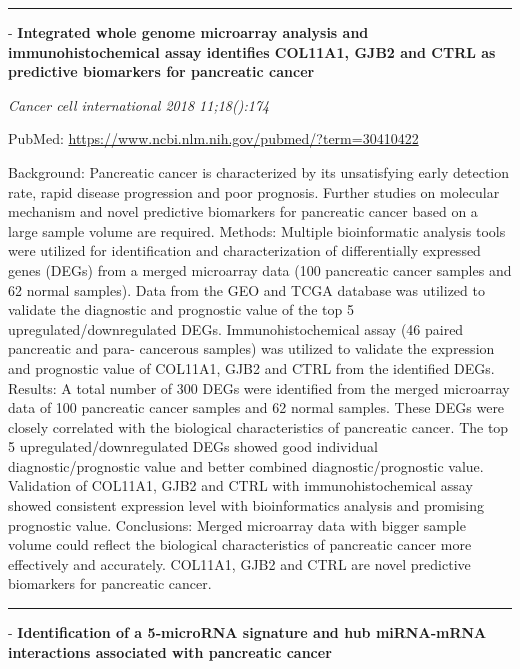 \documentclass[]{article}
\begin{document}
\begin{center}\rule{0.5\linewidth}{\linethickness}\end{center}

 - \textbf{Integrated whole genome microarray analysis and
immunohistochemical assay identifies COL11A1, GJB2 and CTRL as
predictive biomarkers for pancreatic cancer}

\emph{Cancer cell international 2018 11;18():174}

PubMed: \url{https://www.ncbi.nlm.nih.gov/pubmed/?term=30410422}

Background: Pancreatic cancer is characterized by its unsatisfying early
detection rate, rapid disease progression and poor prognosis. Further
studies on molecular mechanism and novel predictive biomarkers for
pancreatic cancer based on a large sample volume are required. Methods:
Multiple bioinformatic analysis tools were utilized for identification
and characterization of differentially expressed genes (DEGs) from a
merged microarray data (100 pancreatic cancer samples and 62 normal
samples). Data from the GEO and TCGA database was utilized to validate
the diagnostic and prognostic value of the top 5
upregulated/downregulated DEGs. Immunohistochemical assay (46 paired
pancreatic and para- cancerous samples) was utilized to validate the
expression and prognostic value of COL11A1, GJB2 and CTRL from the
identified DEGs. Results: A total number of 300 DEGs were identified
from the merged microarray data of 100 pancreatic cancer samples and 62
normal samples. These DEGs were closely correlated with the biological
characteristics of pancreatic cancer. The top 5
upregulated/downregulated DEGs showed good individual
diagnostic/prognostic value and better combined diagnostic/prognostic
value. Validation of COL11A1, GJB2 and CTRL with immunohistochemical
assay showed consistent expression level with bioinformatics analysis
and promising prognostic value. Conclusions: Merged microarray data with
bigger sample volume could reflect the biological characteristics of
pancreatic cancer more effectively and accurately. COL11A1, GJB2 and
CTRL are novel predictive biomarkers for pancreatic cancer.

{}

{}

\begin{center}\rule{0.5\linewidth}{\linethickness}\end{center}

 - \textbf{Identification of a 5‑microRNA signature and hub miRNA‑mRNA
interactions associated with pancreatic cancer}
\end{document}
